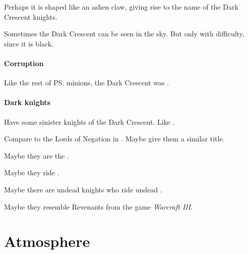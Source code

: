 Perhaps it is shaped like an ashen claw, giving rise to the name of the Dark Crescent knights. 

Sometimes the Dark Crescent can be seen in the sky. But only with difficulty, since it is black. 





\subsubsection{Corruption}
Like the rest of \ps{\Secherdamon} minions, the Dark Crescent was . 





\subsubsection{Dark knights}
Have some sinister knights of the Dark Crescent. Like . 

Compare to the Lords of Negation in \FLuneNoire. Maybe give them a similar title. 

Maybe they are the . 

Maybe they ride .

Maybe there are undead knights who ride undead \vreiiden.

Maybe they resemble Revenants from the game \emph{Warcraft III}. 







































\chapter{Atmosphere}















